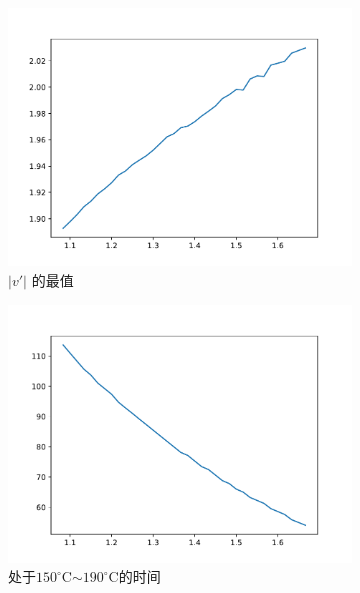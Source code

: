 \documentclass[../main.tex]{subfiles}
\begin{document}
\begin{figure}[H]
\centering
	\begin{subfigure}[b]{0.4\textwidth}
		\centering
		\includegraphics[width=\textwidth]{k.pdf}
		\caption{\(\vert v' \vert\) 的最值}
	\end{subfigure}
	\begin{subfigure}[b]{0.4\textwidth}
		\centering
		\includegraphics[width=\textwidth]{190170.pdf}
		\caption{处于\(150 ^{\circ}\mathrm{C}\)\(\sim\)\(190 ^{\circ}\mathrm{C}\)的时间}
	\end{subfigure}
	\begin{subfigure}[b]{0.4\textwidth}
		\centering

\end{subfigure}
\end{figure}
\end{document}
